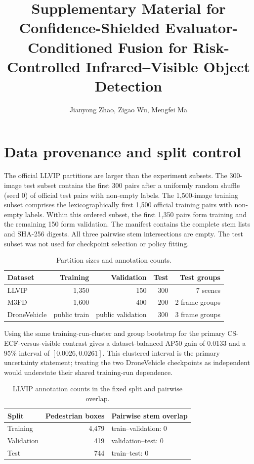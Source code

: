 \documentclass[11pt]{article}
\title{Supplementary Material for\\Confidence-Shielded
Evaluator-Conditioned Fusion for Risk-Controlled Infrared--Visible Object
Detection}
\author{Jianyong Zhao, Zigao Wu, Mengfei Ma}
\date{}
\begin{document}
\maketitle
\sloppy

\section{Data provenance and split control}

The official LLVIP partitions are larger than the experiment subsets. The
300-image test subset contains the first 300 pairs after a uniformly random
shuffle (seed 0) of official test pairs with non-empty labels. The
1,500-image training subset comprises the lexicographically first 1,500
official training pairs with non-empty labels. Within this ordered subset, the
first 1,350 pairs form training and the remaining 150 form validation. The
manifest contains the complete stem lists and SHA-256 digests. All three
pairwise stem intersections are empty. The test subset was not used for
checkpoint selection or policy fitting.

\begin{table}[h]
\centering
\small
\caption{Partition sizes and annotation counts.}
\begin{tabular}{@{}lrrrr@{}}
\toprule
Dataset & Training & Validation & Test & Test groups \\
\midrule
LLVIP & 1,350 & 150 & 300 & 7 scenes \\
M3FD & 1,600 & 400 & 200 & 2 frame groups \\
DroneVehicle & public train & public validation & 300 & 3 frame groups \\
\bottomrule
\end{tabular}
\end{table}

Using the same training-run-cluster and group bootstrap for the primary
CS-ECF-versus-visible contrast gives a dataset-balanced AP50 gain of 0.0133 and
a 95\% interval of \([0.0026,0.0261]\). This clustered interval is the primary
uncertainty statement; treating the two DroneVehicle checkpoints as independent
would understate their shared training-run dependence.

\begin{table}[h]
\centering
\small
\caption{LLVIP annotation counts in the fixed split and pairwise overlap.}
\begin{tabular}{@{}lrl@{}}
\toprule
Split & Pedestrian boxes & Pairwise stem overlap \\
\midrule
Training & 4,479 & train--validation: 0 \\
Validation & 419 & validation--test: 0 \\
Test & 744 & train--test: 0 \\
\bottomrule
\end{tabular}
\end{table}
\end{document}
